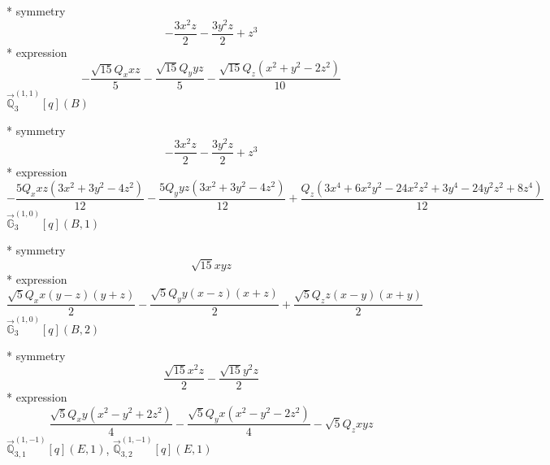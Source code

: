 \documentclass[fleqn,8pt]{jsarticle}
\begin{document}
\noindent\quad ** symmetry
\begin{dmath*}
- \frac{3 x^{2} z}{2} - \frac{3 y^{2} z}{2} + z^{3}
\end{dmath*}
\noindent\quad ** expression
\begin{dmath*}
- \frac{\sqrt{15} Q_{x} x z}{5} - \frac{\sqrt{15} Q_{y} y z}{5} - \frac{\sqrt{15} Q_{z} \left(x^{2} + y^{2} - 2 z^{2}\right)}{10}
\end{dmath*}
\noindent\quad $\vec{\mathbb{Q}}_{3}^{(1,1)}[q](B)$

\noindent\quad ** symmetry
\begin{dmath*}
- \frac{3 x^{2} z}{2} - \frac{3 y^{2} z}{2} + z^{3}
\end{dmath*}
\noindent\quad ** expression
\begin{dmath*}
- \frac{5 Q_{x} x z \left(3 x^{2} + 3 y^{2} - 4 z^{2}\right)}{12} - \frac{5 Q_{y} y z \left(3 x^{2} + 3 y^{2} - 4 z^{2}\right)}{12} + \frac{Q_{z} \left(3 x^{4} + 6 x^{2} y^{2} - 24 x^{2} z^{2} + 3 y^{4} - 24 y^{2} z^{2} + 8 z^{4}\right)}{12}
\end{dmath*}
\noindent\quad $\vec{\mathbb{G}}_{3}^{(1,0)}[q](B,1)$

\noindent\quad ** symmetry
\begin{dmath*}
\sqrt{15} x y z
\end{dmath*}
\noindent\quad ** expression
\begin{dmath*}
\frac{\sqrt{5} Q_{x} x \left(y - z\right) \left(y + z\right)}{2} - \frac{\sqrt{5} Q_{y} y \left(x - z\right) \left(x + z\right)}{2} + \frac{\sqrt{5} Q_{z} z \left(x - y\right) \left(x + y\right)}{2}
\end{dmath*}
\noindent\quad $\vec{\mathbb{G}}_{3}^{(1,0)}[q](B,2)$

\noindent\quad ** symmetry
\begin{dmath*}
\frac{\sqrt{15} x^{2} z}{2} - \frac{\sqrt{15} y^{2} z}{2}
\end{dmath*}
\noindent\quad ** expression
\begin{dmath*}
\frac{\sqrt{5} Q_{x} y \left(x^{2} - y^{2} + 2 z^{2}\right)}{4} - \frac{\sqrt{5} Q_{y} x \left(x^{2} - y^{2} - 2 z^{2}\right)}{4} - \sqrt{5} Q_{z} x y z
\end{dmath*}
\noindent\quad $\vec{\mathbb{Q}}_{3,1}^{(1,-1)}[q](E,1)$, $\vec{\mathbb{Q}}_{3,2}^{(1,-1)}[q](E,1)$
\end{document}
